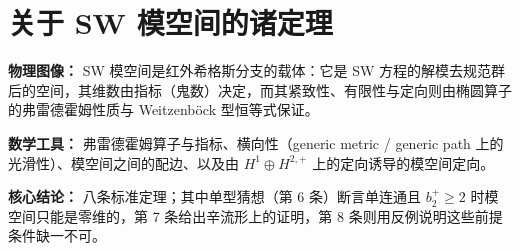 

\section{关于 SW 模空间的诸定理}

\begin{keytakeaways}
\item \textbf{物理图像：} SW 模空间是红外希格斯分支的载体：它是 SW 方程的解模去规范群后的空间，其维数由指标（鬼数）决定，而其紧致性、有限性与定向则由椭圆算子的弗雷德霍姆性质与 Weitzenböck 型恒等式保证。
\item \textbf{数学工具：} 弗雷德霍姆算子与指标、横向性（generic metric / generic path 上的光滑性）、模空间之间的配边、以及由 $H^{1}\oplus H^{2,+}$ 上的定向诱导的模空间定向。
\item \textbf{核心结论：} 八条标准定理；其中单型猜想（第 6 条）断言单连通且 $b_{2}^{+}\ge2$ 时模空间只能是零维的，第 7 条给出辛流形上的证明，第 8 条则用反例说明这些前提条件缺一不可。
\end{keytakeaways}

